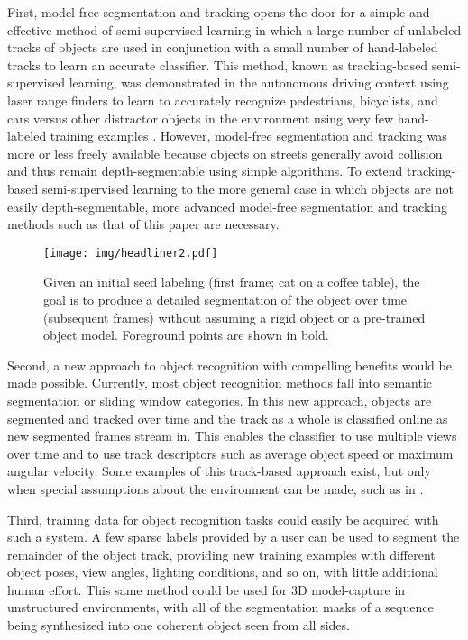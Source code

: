 \documentclass[graybox]{svmult}
\begin{document}
First, model-free segmentation and tracking opens the door for a simple and effective method of semi-supervised learning in which a large number of unlabeled tracks of objects are used in conjunction with a small number of hand-labeled tracks to learn an accurate classifier.  This method, known as tracking-based semi-supervised learning, was demonstrated in the autonomous driving context using laser range finders to learn to accurately recognize pedestrians, bicyclists, and cars versus other distractor objects in the environment using very few hand-labeled training examples \cite{teichman2011b}. However, model-free segmentation and tracking was more or less freely available because objects on streets generally avoid collision and thus remain depth-segmentable using simple algorithms.  To extend tracking-based semi-supervised learning to the more general case in which objects are not easily depth-segmentable, more advanced model-free segmentation and tracking methods such as that of this paper are necessary.

\begin{figure}
  \centering
  \texttt{[image: img/headliner2.pdf]}
  \caption{Given an initial seed labeling (first frame; cat on a coffee table), the goal is to produce a detailed segmentation of the object over time (subsequent frames) without assuming a rigid object or a pre-trained object model.  Foreground points are shown in bold.}
  \label{fig:goal}
\end{figure}


Second, a new approach to object recognition with compelling benefits would be made possible.  Currently, most object recognition methods fall into semantic segmentation or sliding window categories.  In this new approach, objects are segmented and tracked over time and the track as a whole is classified online as new segmented frames stream in.  This enables the classifier to use multiple views over time and to use track descriptors such as average object speed or maximum angular velocity.  Some examples of this track-based approach exist, but only when special assumptions about the environment can be made, such as in \cite{teichman2011a}.

Third, training data for object recognition tasks could easily be acquired with such a system.  A few sparse labels provided by a user can be used to segment the remainder of the object track, providing new training examples with different object poses, view angles, lighting conditions, and so on, with little additional human effort.  This same method could be used for 3D model-capture in unstructured environments, with all of the segmentation masks of a sequence being synthesized into one coherent object seen from all sides.
\end{document}
